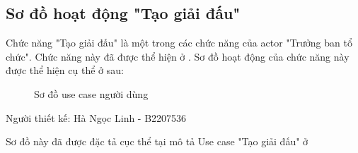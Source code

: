 \subsection{Sơ đồ hoạt động "Tạo giải đấu"}
\setcounter{figure}{0}

Chức năng "Tạo giải đấu" là một trong các chức năng của actor "Trưởng ban tổ chức".
Chức năng này đã được thể hiện ở \myref{}.
Sơ đồ hoạt động của chức năng này được thể hiện cụ thể ở  sau:

\begin{figure}[H]
  \centering
  
  \caption{Sơ đồ use case người dùng}
  \label{fig:at-1}
\end{figure}

Người thiết kế: Hà Ngọc Linh - B2207536

Sơ đồ này đã được đặc tả cục thể tại mô tả Use case "Tạo giải đấu" ở

